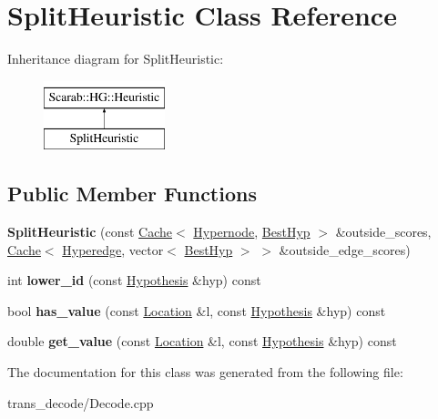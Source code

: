 \hypertarget{classSplitHeuristic}{
\section{SplitHeuristic Class Reference}
\label{classSplitHeuristic}
}
Inheritance diagram for SplitHeuristic:\begin{figure}[H]
\begin{center}
\leavevmode
\includegraphics[height=2cm]{classSplitHeuristic}
\end{center}
\end{figure}
\subsection*{Public Member Functions}
\begin{DoxyCompactItemize}
\item 
\hypertarget{classSplitHeuristic_a8f58e4a4833f73460e2b2fb9c38448f1}{
{\bfseries SplitHeuristic} (const \hyperlink{classCache}{Cache}$<$ \hyperlink{classScarab_1_1HG_1_1Hypernode}{Hypernode}, \hyperlink{classScarab_1_1HG_1_1BestHyp}{BestHyp} $>$ \&outside\_\-scores, \hyperlink{classCache}{Cache}$<$ \hyperlink{classScarab_1_1HG_1_1Hyperedge}{Hyperedge}, vector$<$ \hyperlink{classScarab_1_1HG_1_1BestHyp}{BestHyp} $>$ $>$ \&outside\_\-edge\_\-scores)}
\label{classSplitHeuristic_a8f58e4a4833f73460e2b2fb9c38448f1}

\item 
\hypertarget{classSplitHeuristic_a0080cc4428de2635263f31d7931c3066}{
int {\bfseries lower\_\-id} (const \hyperlink{structScarab_1_1HG_1_1Hypothesis}{Hypothesis} \&hyp) const }
\label{classSplitHeuristic_a0080cc4428de2635263f31d7931c3066}

\item 
\hypertarget{classSplitHeuristic_a7117c99ce380835ed38aa02f82f8a04e}{
bool {\bfseries has\_\-value} (const \hyperlink{structScarab_1_1HG_1_1Location}{Location} \&l, const \hyperlink{structScarab_1_1HG_1_1Hypothesis}{Hypothesis} \&hyp) const }
\label{classSplitHeuristic_a7117c99ce380835ed38aa02f82f8a04e}

\item 
\hypertarget{classSplitHeuristic_ab64ec7cde28b49828bcde1ad97862cc2}{
double {\bfseries get\_\-value} (const \hyperlink{structScarab_1_1HG_1_1Location}{Location} \&l, const \hyperlink{structScarab_1_1HG_1_1Hypothesis}{Hypothesis} \&hyp) const }
\label{classSplitHeuristic_ab64ec7cde28b49828bcde1ad97862cc2}

\end{DoxyCompactItemize}


The documentation for this class was generated from the following file:\begin{DoxyCompactItemize}
\item 
trans\_\-decode/Decode.cpp\end{DoxyCompactItemize}
